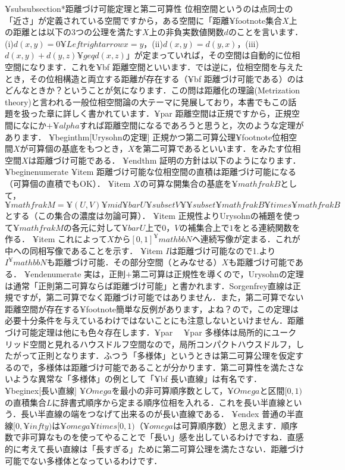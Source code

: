 ¥subsubsection*{距離づけ可能定理と第二可算性}
位相空間というのは点同士の「近さ」が定義されている空間ですから，ある空間に「距離¥footnote{集合$X$上の距離とは以下の3つの公理を満たす$X$上の非負実数値関数$d$のことを言います．(i)$d(x,y)=0¥Leftrightarrow x=y$，(ii)$d(x,y)=d(y,x)$，(iii)$d(x,y)+d(y,z)¥geq d(x,z)$}」が定まっていれば，その空間は自動的に位相空間になります．これを{¥bf 距離空間}といいます．では逆に，位相空間を与えたとき，その位相構造と両立する距離が存在する（{¥bf 距離づけ可能である}）のはどんなときか？ということが気になります．この問は距離化の理論(Metrization theory)と言われる一般位相空間論の大テーマに発展しており，本書でもこの話題を扱った章に詳しく書かれています．¥par
距離空間は正規ですから，正規空間になにか$+¥alpha$すれば距離空間になるであろうと思うと，次のような定理があります．
¥begin{thm}[Urysohnの定理]
正規かつ第二可算公理¥footnote{位相空間$X$が可算個の基底をもつとき，$X$を第二可算であるといいます．}をみたす位相空間$X$は距離づけ可能である．
¥end{thm}
証明の方針は以下のようになります．
¥begin{enumerate}
¥item 距離づけ可能な位相空間の直積は距離づけ可能になる（可算個の直積でもOK）．
¥item $X$の可算な開集合の基底を$¥mathfrak{B}$として，$¥mathfrak{M}=¥{(U,V)¥mid ¥bar{U}¥subset V ¥}¥subset ¥mathfrak{B}¥times¥mathfrak{B}$とする（この集合の濃度は勿論可算）．
¥item 正規性よりUrysohnの補題を使って$¥mathfrak{M}$の各元に対して$¥bar{U}$上で$0$，$V$の補集合上で$1$をとる連続関数を作る．
¥item これによって$X$から$[0,1]^¥mathbb{N}$へ連続写像が定まる．これが中への同相写像であることを示す．
¥item $I$は距離づけ可能なので1.より$I^¥mathbb{N}$も距離づけ可能．その部分空間（とみなせる）$X$も距離づけ可能である．
¥end{enumerate}
実は，正則$+$第二可算は正規性を導くので，Urysohnの定理は通常「正則第二可算ならば距離づけ可能」と書かれます．Sorgenfrey直線は正規ですが，第二可算でなく距離づけ可能ではありません．また，第二可算でない距離空間が存在する¥footnote{簡単な反例があります，よね？}ので，この定理は必要十分条件を与えているわけではないことにも注意しないといけません．距離づけ可能定理は他にも色々存在します．¥par
　¥par
多様体は局所的にユークリッド空間と見れるハウスドルフ空間なので，局所コンパクトハウスドルフ，したがって正則となります．ふつう「多様体」というときは第二可算公理を仮定するので，多様体は距離づけ可能であることが分かります．第二可算性を満たさないような異常な「多様体」の例として「{¥bf 長い直線}」は有名です．
¥begin{ex}[長い直線]
$¥Omega$を最小の非可算順序数として，$¥Omega$と区間$[0,1)$の直積集合$L$に辞書式順序から定まる順序位相を入れる．これを長い半直線という．長い半直線の端をつなげて出来るのが長い直線である．
¥end{ex}
普通の半直線$[0,¥infty)$は$¥omega¥times[0,1)$（$¥omega$は可算順序数）と思えます．順序数で非可算なものを使ってやることで「長い」感を出しているわけですね．直感的に考えて長い直線は「長すぎる」ために第二可算公理を満たさない．距離づけ可能でない多様体となっているわけです．
